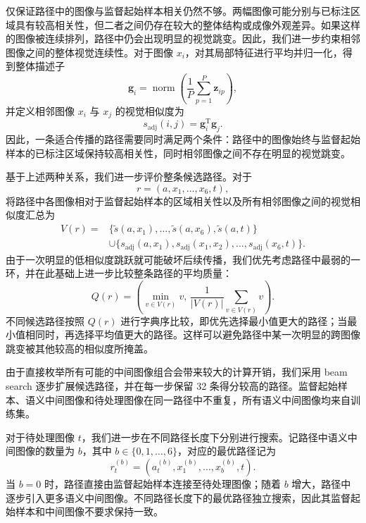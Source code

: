 \documentclass[UTF8,a4paper,10pt,twocolumn]{ctexart}
\begin{document}
仅保证路径中的图像与监督起始样本相关仍然不够。两幅图像可能分别与已标注区域具有较高相关性，但二者之间仍存在较大的整体结构或成像外观差异。如果这样的图像被连续排列，路径中仍会出现明显的视觉跳变。因此，我们进一步约束相邻图像之间的整体视觉连续性。对于图像 $x_i$，对其局部特征进行平均并归一化，得到整体描述子
\begin{equation}
\mathbf{g}_i
=
\operatorname{norm}
\left(
\frac{1}{P}
\sum_{p=1}^{P}
\mathbf{z}_{ip}
\right),
\end{equation}
并定义相邻图像 $x_i$ 与 $x_j$ 的视觉相似度为
\begin{equation}
s_{\mathrm{adj}}(i,j)
=
\mathbf{g}_i^{\mathrm T}\mathbf{g}_j.
\end{equation}
因此，一条适合传播的路径需要同时满足两个条件：路径中的图像始终与监督起始样本的已标注区域保持较高相关性，同时相邻图像之间不存在明显的视觉跳变。

基于上述两种关系，我们进一步评价整条候选路径。对于
\begin{equation}
r=(a,x_1,\ldots,x_6,t),
\end{equation}
将路径中各图像相对于监督起始样本的区域相关性以及所有相邻图像之间的视觉相似度汇总为
\begin{equation}
\begin{aligned}
V(r)=&
\{
\widetilde{s}(a,x_1),
\ldots,
\widetilde{s}(a,x_6),
\widetilde{s}(a,t)
\}\\
&\cup
\{
s_{\mathrm{adj}}(a,x_1),
s_{\mathrm{adj}}(x_1,x_2),
\ldots,
s_{\mathrm{adj}}(x_6,t)
\}.
\end{aligned}
\end{equation}
由于一次明显的低相似度跳跃就可能破坏后续传播，我们优先考虑路径中最弱的一环，并在此基础上进一步比较整条路径的平均质量：
\begin{equation}
Q(r)
=
\left(
\min_{v\in V(r)}v,\,
\frac{1}{|V(r)|}
\sum_{v\in V(r)}v
\right).
\end{equation}
不同候选路径按照 $Q(r)$ 进行字典序比较，即优先选择最小值更大的路径；当最小值相同时，再选择平均值更大的路径。这样可以避免路径中某一次明显的跨图像跳变被其他较高的相似度所掩盖。

由于直接枚举所有可能的中间图像组合会带来较大的计算开销，我们采用 beam search 逐步扩展候选路径，并在每一步保留 32 条得分较高的路径。监督起始样本、语义中间图像和待处理图像在同一路径中不重复，所有语义中间图像均来自训练集。

对于待处理图像 $t$，我们进一步在不同路径长度下分别进行搜索。记路径中语义中间图像的数量为 $b$，其中 $b\in\{0,1,\ldots,6\}$，对应的最优路径记为
\[
r_t^{(b)}
=
\left(
a_t^{(b)},
x_1^{(b)},
\ldots,
x_b^{(b)},
t
\right).
\]
当 $b=0$ 时，路径直接由监督起始样本连接至待处理图像；随着 $b$ 增大，路径中逐步引入更多语义中间图像。不同路径长度下的最优路径独立搜索，因此其监督起始样本和中间图像不要求保持一致。
\end{document}
